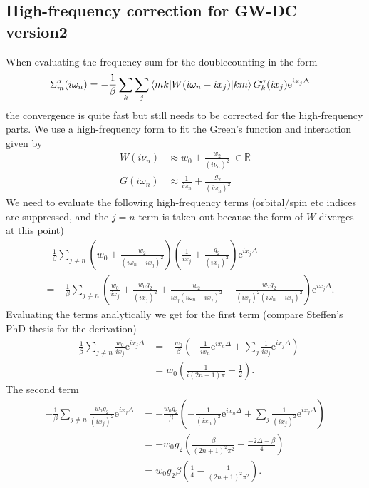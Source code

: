 \documentclass[12pt,a4paper]{scrartcl}
\numberwithin{equation}{section}
\begin{document}
\subsection{High-frequency correction for GW-DC version2}
When evaluating the frequency sum for the doublecounting in the form 
\begin{align}
  \Sigma_m^{\sigma}(i\omega_n) 
%
  &= -\frac{1}{\beta}\sum_k \sum_{j}
   \braket{m k | W(i\omega_n- ix_j )|k m}G^{\sigma}_{k}(ix_j)
   \mathrm{e}^{ix_j \Delta}
\end{align}
the convergence is quite fast but still needs to be corrected
for the high-frequency parts.
We use a high-frequency form to fit the Green's function and interaction
given by
\begin{align}
 W(i\nu_n)    &\approx w_0 + \frac{w_2}{(i\nu_n)^2} \ \in \mathbb{R} \\
 G(i\omega_n) &\approx  \frac{1}{i\omega_n} + \frac{g_2}{(i\omega_n)^2} 
\end{align}
We need to evaluate the following high-frequency terms (orbital/spin etc indices
are suppressed, and the $j=n$ term is taken out because
the form of $W$ diverges at this point)
\begin{align}
& -\frac{1}{\beta}\sum_{j\neq n} 
  \left( w_0 + \frac{w_2}{(i\omega_n -ix_j)^2} \right)
  \left( \frac{1}{ix_j} + \frac{g_2}{(ix_j)^2} \right)
   \mathrm{e}^{ix_j \Delta} \\
% 
&= -\frac{1}{\beta} \sum_{j\neq n}
\left( 
  \frac{w_0}{ix_j} + \frac{w_0 g_2}{(ix_j)^2}
+ \frac{w_2}{ix_j(i\omega_n -ix_j)^2} + \frac{w_2g_2}{(ix_j)^2 (i\omega_n -ix_j)^2}
\right)
\mathrm{e}^{ix_j \Delta}.
\end{align}
Evaluating the terms analytically we get for the first term (compare Steffen's PhD thesis
for the derivation)
\begin{align}
-\frac{1}{\beta} \sum_{j\neq n}  \frac{w_0}{ix_j} \mathrm{e}^{ix_j \Delta}
&= -\frac{w_0}{\beta} \left( -\frac{1}{ix_n} \mathrm{e}^{ix_n \Delta}  + \sum_{j}  \frac{1}{ix_j} \mathrm{e}^{ix_j \Delta}\right) \\
&= w_0 \left( \frac{1}{i(2n+1)\pi} -\frac{1}{2} \right).
\end{align}
The second term
\begin{align}
-\frac{1}{\beta} \sum_{j\neq n}  \frac{w_0 g_2}{(ix_j)^2} \mathrm{e}^{ix_j \Delta} 
&= -\frac{w_0 g_2}{\beta}\left(- \frac{1}{(ix_n)^2} \mathrm{e}^{ix_n \Delta}   + \sum_{j}  \frac{1}{(ix_j)^2} \mathrm{e}^{ix_j \Delta}\right)   \\
&= -w_0 g_2\left( \frac{\beta}{(2n+1)^2\pi^2} + \frac{-2\Delta-\beta}{4} \right)   \\
&=  w_0 g_2\beta\left( \frac{1}{4} -\frac{1}{(2n+1)^2\pi^2} \right) .
\end{align}
\end{document}

